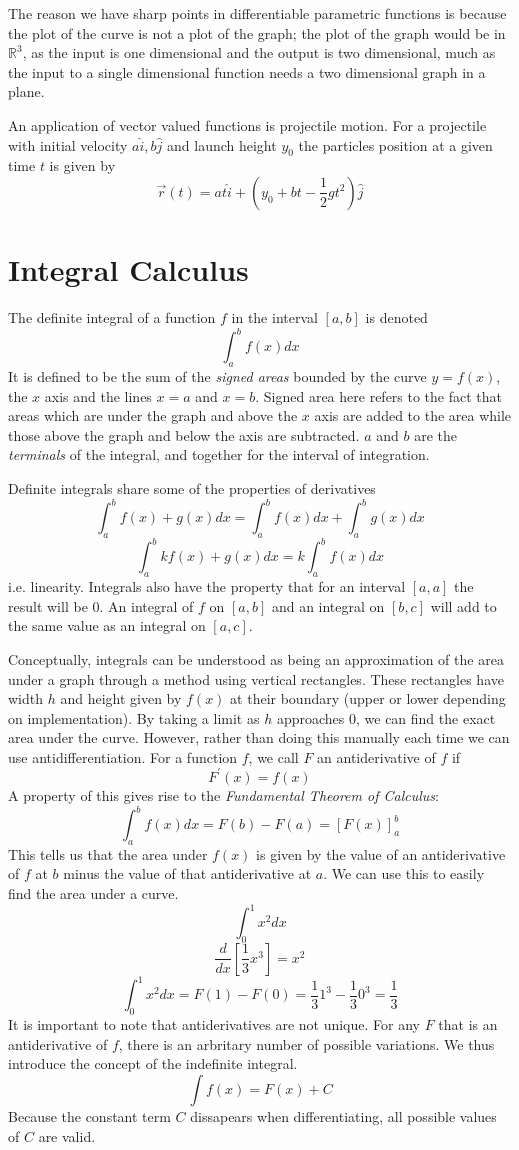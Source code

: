 \documentclass[12pt]{report}
\newcommand{\R}{\mathbb{R}}
\begin{document}
\begin{flushleft}
\bigskip
The reason we have sharp points in differentiable parametric functions is 
because the plot of the curve is not a plot of the graph; the plot of the
graph would be in \(\R^3\), as the input is one dimensional and the output
is two dimensional, much as the input to a single dimensional function needs
a two dimensional graph in a plane.

\bigskip
An application of vector valued functions is projectile motion. For a 
projectile with initial velocity \(a\hat{i}, b\hat{j}\) and launch height 
\(y_0\) the particles position at a given time \(t\) is given by
\[\vec{r}(t) = at\hat{i} + (y_0 + bt - \frac{1}{2}gt^2)\hat{j}\]

\section*{Integral Calculus}
The definite integral of a function \(f\) in the interval \([a, b]\) is
denoted
\[\int_a^b f(x) dx\]
It is defined to be the sum of the \textit{signed areas} bounded by the curve
\(y = f(x)\), the \(x\) axis and the lines \(x = a\) and \(x = b\). Signed area
here refers to the fact that areas which are under the graph and above the 
\(x\) axis are added to the area while those above the graph and below the axis
are subtracted. \(a\) and \(b\) are the \textit{terminals} of the integral, and
together for the interval of integration.

\bigskip
Definite integrals share some of the properties of derivatives
\[\int_a^b f(x) + g(x) dx = \int_a^b f(x) dx + \int_a^b g(x) dx\]
\[\int_a^b kf(x) + g(x) dx = k\int_a^b f(x) dx\]
i.e. linearity. Integrals also have the property that for an interval 
\([a, a]\) the result will be \(0\). An integral of \(f\) on \([a, b]\)
and an integral on \([b, c]\) will add to the same value as an integral
on \([a, c]\). 

\bigskip
Conceptually, integrals can be understood as being an approximation of the area
under a graph through a method using vertical rectangles. These rectangles have
width \(h\) and height given by \(f(x)\) at their boundary (upper or lower 
depending on implementation). By taking a limit as \(h\) approaches \(0\), we
can find the exact area under the curve. However, rather than doing this 
manually each time we can use antidifferentiation. For a function \(f\), we
call \(F\) an antiderivative of \(f\) if
\[F^\prime(x) = f(x)\]
A property of this gives rise to the \textit{Fundamental Theorem of Calculus}:
\[\int_a^b f(x) dx = F(b) - F(a) = [F(x)]_a^b\]
This tells us that the area under \(f(x)\) is given by the value of an 
antiderivative of \(f\) at \(b\) minus the value of that antiderivative at 
\(a\). We can use this to easily find the area under a curve.
\[\int_0^1 x^2 dx\]
\[\frac{d}{dx}[\frac{1}{3}x^3] = x^2\]
\[\int_0^1 x^2 dx = F(1) - F(0) = \frac{1}{3}1^3 - \frac{1}{3}0^3=\frac{1}{3}\]
It is important to note that antiderivatives are not unique. For any \(F\) that
is an antiderivative of \(f\), there is an arbritary number of possible 
variations. We thus introduce the concept of the indefinite integral.
\[\int f(x) = F(x) + C\]
Because the constant term \(C\) dissapears when differentiating, all possible
values of \(C\) are valid.


\end{flushleft}
\end{document}
